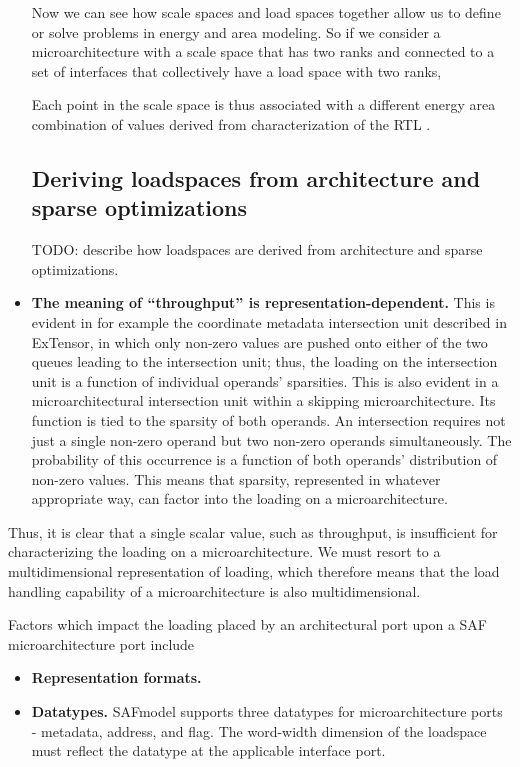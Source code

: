 \begin{itemize}
Now we can see how scale spaces and load spaces together allow us to define or solve problems in energy and area modeling. So if we consider a microarchitecture with a scale space that has two ranks and connected to a set of interfaces that collectively have a load space with two ranks,

Each point in the scale space is thus associated with a different energy area combination of values derived from characterization of the RTL .

\subsection{Deriving loadspaces from architecture and sparse optimizations}

TODO: describe how loadspaces are derived from architecture and sparse optimizations.

    \item \textbf{The meaning of ``throughput'' is representation-dependent.} This is evident in for example the coordinate metadata intersection unit described in ExTensor\cite{TODO}, in which only non-zero values are pushed onto either of the two queues leading to the intersection unit; thus, the loading on the intersection unit is a function of individual operands' sparsities. This is also evident in a microarchitectural intersection unit within a skipping microarchitecture. Its function is tied to the sparsity of both operands. An intersection requires not just a single non-zero operand but two non-zero operands simultaneously. The probability of this occurrence is a function of both operands' distribution of non-zero values. This means that sparsity, represented in whatever appropriate way, can factor into the loading on a microarchitecture.
\end{itemize}

Thus, it is clear that a single scalar value, such as throughput, is insufficient for characterizing the loading on a microarchitecture. We must resort to a multidimensional representation of loading, which therefore means that the load handling capability of a microarchitecture is also multidimensional.

Factors which impact the loading placed by an architectural port upon a SAF microarchitecture port include

\begin{itemize}
    \item \textbf{Representation formats.}
    \item \textbf{Datatypes.} SAFmodel supports three datatypes for microarchitecture ports - metadata, address, and flag. The word-width dimension of the loadspace must reflect the datatype at the applicable interface port.
\end{itemize}

